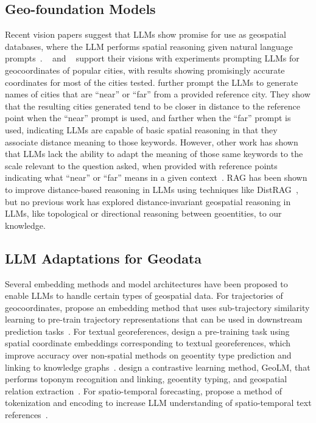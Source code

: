 \subsection{Geo-foundation Models}
Recent vision papers suggest that LLMs show promise for use as geospatial databases, where the LLM performs spatial reasoning given natural language prompts~\cite{Bhandari2023, Qi2023}.
\citeauthor{Bhandari2023}~\cite{Bhandari2023} and \citeauthor{Qi2023}~\cite{Qi2023} support their visions with experiments prompting LLMs for geocoordinates of popular cities, with results showing promisingly accurate coordinates for most of the cities tested.
\citeauthor{Bhandari2023} further prompt the LLMs to generate names of cities that are ``near'' or ``far'' from a provided reference city.
They show that the resulting cities generated tend to be closer in distance to the reference point when the ``near'' prompt is used, and farther when the ``far'' prompt is used, indicating LLMs are capable of basic spatial reasoning in that they associate distance meaning to those keywords.
However, other work has shown that LLMs lack the ability to adapt the meaning of those same keywords to the scale relevant to the question asked, when provided with reference points indicating what ``near'' or ``far'' means in a given context~\cite{Osullivan2024}.
RAG has been shown to improve distance-based reasoning in LLMs using techniques like DistRAG~\cite{Schneider2025b}, but no previous work has explored distance-invariant geospatial reasoning in LLMs, like topological or directional reasoning between geoentities, to our knowledge.


\subsection{LLM Adaptations for Geodata}
Several embedding methods and model architectures have been proposed to enable LLMs to handle certain types of geospatial data.
For trajectories of geocoordinates, \citeauthor{Hu2023} propose an embedding method that uses sub-trajectory similarity learning to pre-train trajectory representations that can be used in downstream prediction tasks~\cite{Hu2023}.
For textual georeferences, \citeauthor{Li2021} design a pre-training task using spatial coordinate embeddings %
corresponding to textual georeferences, which improve accuracy over non-spatial methods on geoentity type prediction and linking to knowledge graphs~\cite{Li2021}.
\citeauthor{Li2023b} design a contrastive learning method, GeoLM, that performs toponym recognition and linking, geoentity typing, and geospatial relation extraction~\cite{Li2023b}.
For spatio-temporal forecasting, \citeauthor{Liu2024large} propose a method of tokenization and encoding to increase LLM understanding of spatio-temporal text references~\cite{Liu2024large}.

